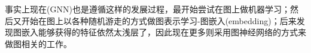 \bigskip
\begin{tcolorbox}
事实上现在(GNN)也是遵循这样的发展过程，最开始尝试在图上做机器学习\cite{yao:graph_ml_2009,li:distributed_2013,gemulla:mf_2011}；然后又开始在图上以各种随机游走的方式做图表示学习-图嵌入(embedding)\cite{perozzi:deepwalk_2014,grover:node2vec_2016}；后来发现图嵌入能够获得的特征依然太浅层了，因此现在更多则采用图神经网络\cite{kipf:gcn_2017,hamilton:graphsage_2017,li:gated_2016,velickovic:gat_2018}的方式来做图相关的工作。
\end{tcolorbox}